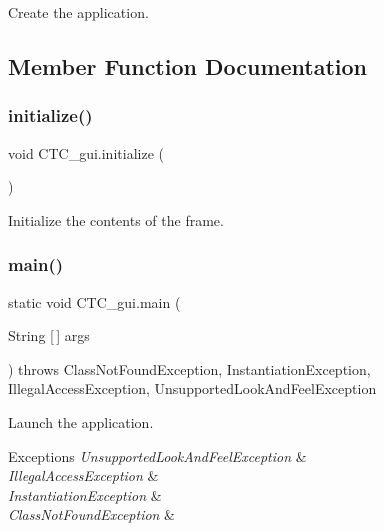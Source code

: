 Create the application. 



\subsection{Member Function Documentation}
\mbox{\label{classCTC__gui_af8298a2936080671d12fc6c0ca5dd7a3}} 
\subsubsection{\texorpdfstring{initialize()}{initialize()}}
{\footnotesize\ttfamily void C\+T\+C\+\_\+gui.\+initialize (\begin{DoxyParamCaption}{ }\end{DoxyParamCaption})\hspace{0.3cm}{\ttfamily [private]}}



Initialize the contents of the frame. 

\mbox{\label{classCTC__gui_ad97ec7b3c189ca4cb572df0156b9a330}} 
\subsubsection{\texorpdfstring{main()}{main()}}
{\footnotesize\ttfamily static void C\+T\+C\+\_\+gui.\+main (\begin{DoxyParamCaption}\item[{String \mbox{[}$\,$\mbox{]}}]{args }\end{DoxyParamCaption}) throws Class\+Not\+Found\+Exception, Instantiation\+Exception, Illegal\+Access\+Exception, Unsupported\+Look\+And\+Feel\+Exception\hspace{0.3cm}{\ttfamily [static]}}



Launch the application. 


\begin{DoxyExceptions}{Exceptions}
{\em Unsupported\+Look\+And\+Feel\+Exception} & \\
\hline
{\em Illegal\+Access\+Exception} & \\
\hline
{\em Instantiation\+Exception} & \\
\hline
{\em Class\+Not\+Found\+Exception} & \\
\hline
\end{DoxyExceptions}
\mbox{\label{classCTC__gui_a985c2650c57b753dcc510ebccc169c63}} 
